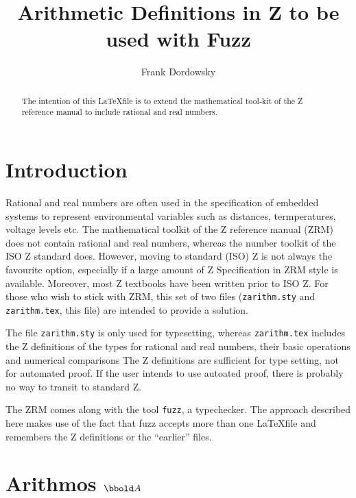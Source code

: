 \documentclass[12pt]{article}
\begin{document}
\title{Arithmetic Definitions in  Z to be used with Fuzz}

\author{Frank Dordowsky}

\maketitle

\begin{abstract}
The intention of this \LaTeX file is to extend the mathematical
tool-kit of the Z reference manual to include rational and real
numbers. 
\end{abstract}


\section{Introduction}
\label{sec:intro}
Rational and real numbers are often used in the specification of
embedded systems to represent environmental variables such as
distances, termperatures, voltage levels etc. The mathematical toolkit
of the Z reference manual (ZRM) does not contain rational and real
numbers, whereas the number toolkit of the ISO Z standard
does. However, moving to standard (ISO) Z is not always the favourite
option, especially if a large amount of Z Specification in ZRM style
is available. Moreover, most Z textbooks have been written prior to
ISO Z. For those who wish to stick with ZRM, this set of two files
(\texttt{zarithm.sty} and \texttt{zarithm.tex}, this file) are
intended to provide a solution.

The file \texttt{zarithm.sty} is only used for typesetting, whereas
\texttt{zarithm.tex} includes the Z definitions of the types for
rational and real numbers, their basic operations and numerical
comparisons The Z definitions are sufficient for type setting, not for
automated proof. If the user intends to use autoated proof, there is
probably no way to transit to standard Z.

The ZRM comes along with the tool \texttt{fuzz}, a typechecker. The
approach described here makes use of the fact that fuzz accepts more
than one \LaTeX file and remembers the Z definitions or the
``earlier'' files.

\section{Arithmos $\arithmos$}
\label{sec:arithmos}
\end{document}
